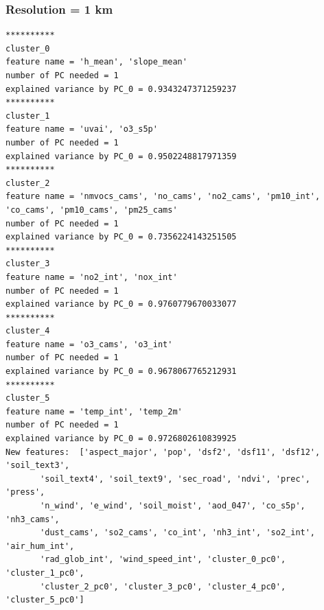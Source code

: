 \subsubsection{Resolution = 1 km}
\begin{verbatim}
**********
cluster_0
feature name = 'h_mean', 'slope_mean'
number of PC needed = 1
explained variance by PC_0 = 0.9343247371259237
**********
cluster_1
feature name = 'uvai', 'o3_s5p'
number of PC needed = 1
explained variance by PC_0 = 0.9502248817971359
**********
cluster_2
feature name = 'nmvocs_cams', 'no_cams', 'no2_cams', 'pm10_int', 'co_cams', 'pm10_cams', 'pm25_cams'
number of PC needed = 1
explained variance by PC_0 = 0.7356224143251505
**********
cluster_3
feature name = 'no2_int', 'nox_int'
number of PC needed = 1
explained variance by PC_0 = 0.9760779670033077
**********
cluster_4
feature name = 'o3_cams', 'o3_int'
number of PC needed = 1
explained variance by PC_0 = 0.9678067765212931
**********
cluster_5
feature name = 'temp_int', 'temp_2m'
number of PC needed = 1
explained variance by PC_0 = 0.9726802610839925
New features:  ['aspect_major', 'pop', 'dsf2', 'dsf11', 'dsf12', 'soil_text3',
       'soil_text4', 'soil_text9', 'sec_road', 'ndvi', 'prec', 'press',
       'n_wind', 'e_wind', 'soil_moist', 'aod_047', 'co_s5p', 'nh3_cams',
       'dust_cams', 'so2_cams', 'co_int', 'nh3_int', 'so2_int', 'air_hum_int',
       'rad_glob_int', 'wind_speed_int', 'cluster_0_pc0', 'cluster_1_pc0',
       'cluster_2_pc0', 'cluster_3_pc0', 'cluster_4_pc0', 'cluster_5_pc0']
\end{verbatim}

